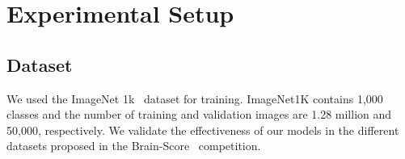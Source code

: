 \documentclass{article} %
\newcommand{\arturo}{\textcolor{violet}}
\begin{document}




\clearpage
\newpage



\clearpage
\newpage

\appendix

\section{Experimental Setup}
\label{label:exp-setup}
\subsection{Dataset} 
We used the ImageNet 1k~\citep{deng2009imagenet} dataset for training. ImageNet1K contains 1,000 classes and the number of training and validation images
are 1.28 million and 50,000, respectively. We validate the effectiveness of our models in the different datasets proposed in the Brain-Score~\citep{schrimpf2020brain}
competition.
\end{document}
